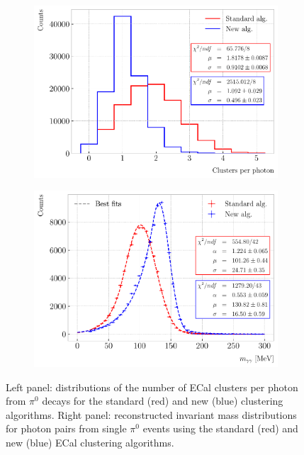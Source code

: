 \begin{figure}[t]
	\begin{subfigure}{0.5\textwidth}
		\centering
		\includegraphics[width=.99\linewidth]{Images/GArSoft_PID/Neutral/coolcluster_clusters_per_photon.pdf}
	\end{subfigure}
	\begin{subfigure}{0.5\textwidth}
		\centering
		\includegraphics[width=.99\linewidth]{Images/GArSoft_PID/Neutral/coolcluster_invariant_mass_vertex.pdf}
	\end{subfigure}
	\caption{Left panel: distributions of the number of ECal clusters per photon from $\pi^{0}$ decays for the standard (red) and new (blue) clustering algorithms. Right panel: reconstructed invariant mass distributions for photon pairs from single $\pi^{0}$ events using the standard (red) and new (blue) ECal clustering algorithms.}
	\label{fig:clustering_pizero}
\end{figure}

